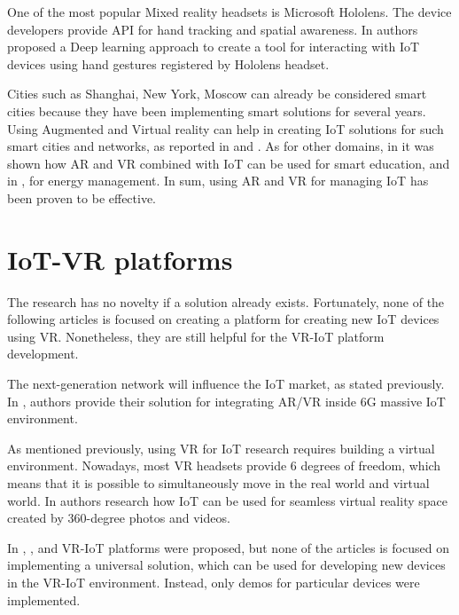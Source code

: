 One of the most popular Mixed reality headsets is Microsoft Hololens. The device developers provide API for hand tracking and spatial awareness. In \cite{sun_magichand_2019} authors proposed a Deep learning approach to create a tool for interacting with IoT devices using hand gestures registered by Hololens headset. 

Cities such as Shanghai, New York, Moscow can already be considered smart cities because they have been implementing smart solutions for several years. Using Augmented and Virtual reality can help in creating IoT solutions for such smart cities and networks, as reported in \cite{chakareski_uav-iot_2019} and \cite{carneiro_bim_2018}. As for other domains, in \cite{paul_role_2019} it was shown how AR and VR combined with IoT can be used for smart education, and in \cite{jang_building_2019-1}, for energy management. In sum, using AR and VR for managing IoT has been proven to be effective.

\section{IoT-VR platforms}

The research has no novelty if a solution already exists. Fortunately, none of the following articles is focused on creating a platform for creating new IoT devices using VR. Nonetheless, they are still helpful for the VR-IoT platform development.

The next-generation network will influence the IoT market, as stated previously. In \cite{liao_information-centric_2021}, authors provide their solution for integrating AR/VR inside 6G massive IoT environment.

As mentioned previously, using VR for IoT research requires building a virtual environment. Nowadays, most VR headsets provide 6 degrees of freedom, which means that it is possible to simultaneously move in the real world and virtual world. In \cite{you_internet_2018} authors research how IoT can be used for seamless virtual reality space created by 360-degree photos and videos.

In \cite{myeong-in_choi_design_2017}, \cite{simiscuka_synchronisation_2018}, \cite{simiscuka_real-virtual_2019} and \cite{krishnan_performance_2020} VR-IoT platforms were proposed, but none of the articles is focused on implementing a universal solution, which can be used for developing new devices in the VR-IoT environment. Instead, only demos for particular devices were implemented.

